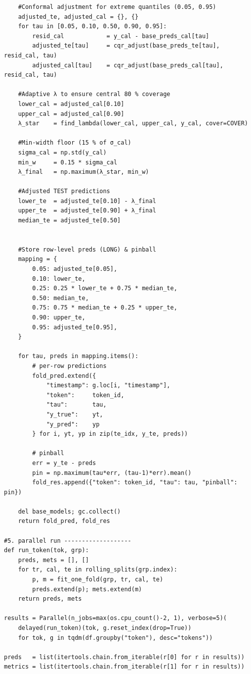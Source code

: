 \documentclass[
  a4paper,
  DIV=11,
  numbers=noendperiod]{scrreprt}
\begin{document}
\begin{verbatim}
    #Conformal adjustment for extreme quantiles (0.05, 0.95)
    adjusted_te, adjusted_cal = {}, {}
    for tau in [0.05, 0.10, 0.50, 0.90, 0.95]:
        resid_cal            = y_cal - base_preds_cal[tau]
        adjusted_te[tau]     = cqr_adjust(base_preds_te[tau], resid_cal, tau)
        adjusted_cal[tau]    = cqr_adjust(base_preds_cal[tau], resid_cal, tau)

    #Adaptive λ to ensure central 80 % coverage
    lower_cal = adjusted_cal[0.10]
    upper_cal = adjusted_cal[0.90]
    λ_star    = find_lambda(lower_cal, upper_cal, y_cal, cover=COVER)

    #Min-width floor (15 % of σ_cal)
    sigma_cal = np.std(y_cal)
    min_w     = 0.15 * sigma_cal
    λ_final   = np.maximum(λ_star, min_w)

    #Adjusted TEST predictions
    lower_te  = adjusted_te[0.10] - λ_final
    upper_te  = adjusted_te[0.90] + λ_final
    median_te = adjusted_te[0.50]


    #Store row-level preds (LONG) & pinball
    mapping = {
        0.05: adjusted_te[0.05],
        0.10: lower_te,
        0.25: 0.25 * lower_te + 0.75 * median_te,
        0.50: median_te,
        0.75: 0.75 * median_te + 0.25 * upper_te,
        0.90: upper_te,
        0.95: adjusted_te[0.95],
    }

    for tau, preds in mapping.items():
        # per-row predictions
        fold_pred.extend({
            "timestamp": g.loc[i, "timestamp"],
            "token":     token_id,
            "tau":       tau,
            "y_true":    yt,
            "y_pred":    yp
        } for i, yt, yp in zip(te_idx, y_te, preds))

        # pinball
        err = y_te - preds
        pin = np.maximum(tau*err, (tau-1)*err).mean()
        fold_res.append({"token": token_id, "tau": tau, "pinball": pin})

    del base_models; gc.collect()
    return fold_pred, fold_res

#5. parallel run -------------------
def run_token(tok, grp):
    preds, mets = [], []
    for tr, cal, te in rolling_splits(grp.index):
        p, m = fit_one_fold(grp, tr, cal, te)
        preds.extend(p); mets.extend(m)
    return preds, mets

results = Parallel(n_jobs=max(os.cpu_count()-2, 1), verbose=5)(
    delayed(run_token)(tok, g.reset_index(drop=True))
    for tok, g in tqdm(df.groupby("token"), desc="tokens"))

preds   = list(itertools.chain.from_iterable(r[0] for r in results))
metrics = list(itertools.chain.from_iterable(r[1] for r in results))


\end{verbatim}
\end{document}
